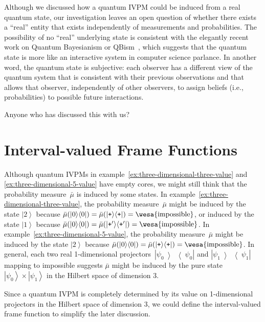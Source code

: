 \documentclass[12pt]{iopart}
\theoremstyle{plain}
\theoremstyle{definition}
\newcommand{\imposs}{{\mbox{\wesa{impossible}}}}
\newcommand{\ket}[1]{{\left\vert{#1}\right\rangle}}
\newcommand{\op}[2]{\ensuremath{\left\vert{#1}\middle\rangle\middle\langle{#2}\right\vert}}
\newcommand{\proj}[1]{\op{#1}{#1}}
\newcommand{\ps}{\texttt{+}}
\begin{document}
Although we discussed how a quantum IVPM could be induced from a real
quantum state, our investigation leaves an open question of whether
there exists a ``real'' entity that exists independently of measurements
and probabilities. The possibility of no ``real'' underlying state
is consistent with the elegantly recent work on Quantum Bayesianism
or QBism~\cite{FuchsSchack2013,FuchsMerminSchack2014,VonBaeyer2016},
which suggests that the quantum state is more like an interactive
system in computer science parlance. In another word, the quantum
state is subjective: each observer has a different view of the quantum
system that is consistent with their previous observations and that
allows that observer, independently of other observers, to assign
beliefs (i.e., probabilities) to possible future interactions.

\ack

Anyone who has discussed this with us?

\appendix

\section{Interval-valued Frame Functions\label{sec:Interval-valued-Frame-Functions}}

Although quantum IVPMs in example~\ref{ex:three-dimensional-three-value}
and \ref{ex:three-dimensional-5-value} have empty cores, we might
still think that the probability measure~$\bar{\mu}$ is induced
by some states. In example~\ref{ex:three-dimensional-three-value},
the probability measure~$\bar{\mu}$ might be induced by the state
$\ket{2}$ because $\bar{\mu}(\proj{0})=\bar{\mu}(\proj{\ps})=\imposs$,
or induced by the state $\ket{1}$ because $\bar{\mu}(\proj{0})=\bar{\mu}(\proj{\ps'})=\imposs$.
In example~\ref{ex:three-dimensional-5-value}, the probability measure~$\bar{\mu}$
might be induced by the state $\ket{2}$ because $\bar{\mu}(\proj{0})=\bar{\mu}(\proj{\ps})=\imposs$.
In general, each two real 1-dimensional projectors~$\proj{\psi_{0}}$
and $\proj{\psi_{1}}$ mapping to impossible suggests $\bar{\mu}$
might be induced by the pure state~$\ket{\psi_{0}}\times\ket{\psi_{1}}$
in the Hilbert space of dimension 3.

Since a quantum IVPM is completely determined by its value on 1-dimensional
projectors in the Hilbert space of dimension 3, we could define the
interval-valued frame function to simplify the later discussion.
\end{document}
